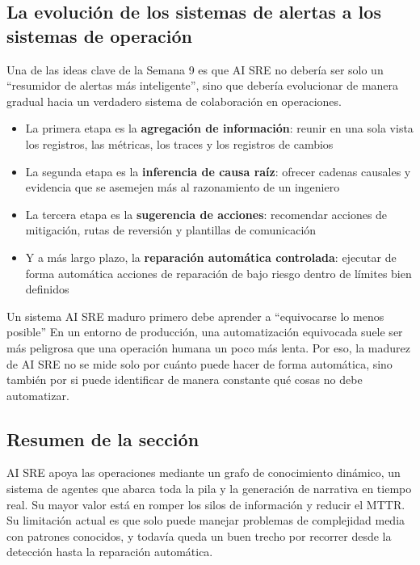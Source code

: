 \subsection{La evolución de los sistemas de alertas a los sistemas de operación}

Una de las ideas clave de la Semana 9 es que AI SRE no debería ser solo un ``resumidor de alertas más inteligente'', sino que debería evolucionar de manera gradual hacia un verdadero sistema de colaboración en operaciones.

\begin{itemize}
    \item La primera etapa es la \textbf{agregación de información}: reunir en una sola vista los registros, las métricas, los traces y los registros de cambios
    \item La segunda etapa es la \textbf{inferencia de causa raíz}: ofrecer cadenas causales y evidencia que se asemejen más al razonamiento de un ingeniero
    \item La tercera etapa es la \textbf{sugerencia de acciones}: recomendar acciones de mitigación, rutas de reversión y plantillas de comunicación
    \item Y a más largo plazo, la \textbf{reparación automática controlada}: ejecutar de forma automática acciones de reparación de bajo riesgo dentro de límites bien definidos
\end{itemize}

\begin{knowledgebox}{Un sistema AI SRE maduro primero debe aprender a ``equivocarse lo menos posible''}
En un entorno de producción, una automatización equivocada suele ser más peligrosa que una operación humana un poco más lenta. Por eso, la madurez de AI SRE no se mide solo por cuánto puede hacer de forma automática, sino también por si puede identificar de manera constante qué cosas no debe automatizar.
\end{knowledgebox}

\subsection{Resumen de la sección}

AI SRE apoya las operaciones mediante un grafo de conocimiento dinámico, un sistema de agentes que abarca toda la pila y la generación de narrativa en tiempo real. Su mayor valor está en romper los silos de información y reducir el MTTR. Su limitación actual es que solo puede manejar problemas de complejidad media con patrones conocidos, y todavía queda un buen trecho por recorrer desde la detección hasta la reparación automática.
